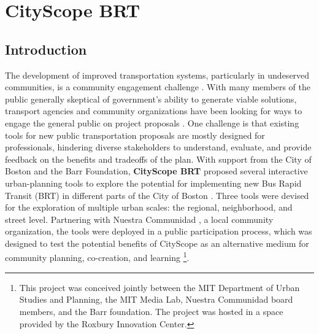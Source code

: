 \section{CityScope BRT}\label{sec:brt}
{
    \subsection{Introduction}
    {
        The development of improved transportation systems, particularly in undeserved communities, is a community engagement challenge \cite{jennings2004urban}. With many members of the public generally skeptical of government's ability to generate viable solutions, transport agencies and community organizations have been looking for ways to engage the general public on project proposals \cite{Innes2016}. One challenge is that existing tools for new public transportation proposals are mostly designed for professionals, hindering diverse stakeholders to understand, evaluate, and provide feedback on the benefits and tradeoffs of the plan.
        \newline
        With support from the City of Boston and the Barr Foundation, \textbf{CityScope BRT} proposed several interactive urban-planning tools to explore the potential for implementing new Bus Rapid Transit (BRT) in different parts of the City of Boston \cite{stewart2018tangible, Newinter52:online}. Three tools were devised for the exploration of multiple urban scales: the regional, neighborhood, and street level. Partnering with Nuestra Communidad \cite{nuestracdc:online}, a local community organization, the tools were deployed in a public participation process, which was designed to test the potential benefits of CityScope as an alternative medium for community planning, co-creation, and learning \footnote{This project was conceived jointly between the MIT Department of Urban Studies and Planning, the MIT Media Lab, Nuestra Communidad board members, and the Barr foundation. The project was hosted in a space provided by the Roxbury Innovation Center.}.


}}

